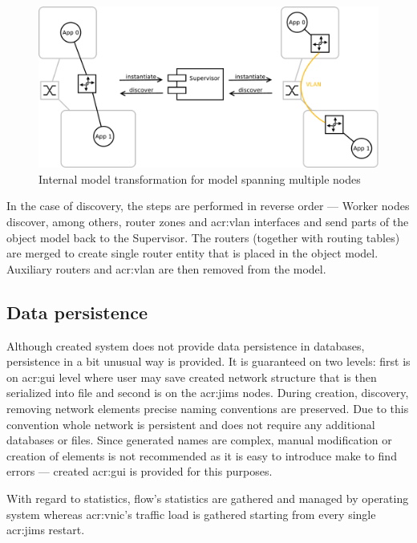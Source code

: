 \documentclass[11pt,openany]{book}
\begin{document}
          \begin{figure}[h]
            \centering
            \includegraphics[width=.9\textwidth]{img/test-case/router.pdf}

            \caption{Internal model transformation for model spanning multiple nodes}
            \label{fig:impl:router}
          \end{figure}

          In the case of discovery, the steps are performed in reverse order --- Worker nodes discover, among others,
          router zones and \gls{acr:vlan} interfaces and send parts of the object model back to the Supervisor. The
          routers (together with routing tables) are merged to create single router entity that is placed in the object
          model. Auxiliary routers and \gls{acr:vlan} are then removed from the model.
			
		
      \subsection{Data persistence}
      \label{sec:impl:persist}

        Although created system does not provide data persistence in databases, persistence in a bit unusual way  is
        provided. It is guaranteed on two levels: first is on \gls{acr:gui} level where user may save created network
        structure that is then serialized into file and second is on the \gls{acr:jims} nodes. During creation,
        discovery, removing network elements precise naming conventions are preserved. Due to this convention whole
        network is persistent and does not require any additional databases or files. Since generated names are complex,
        manual modification or creation of elements is not recommended as it is easy to introduce make to find errors
        --- created \gls{acr:gui} is provided for this purposes.

        With regard to statistics, flow's statistics are gathered and managed by operating system whereas
        \gls{acr:vnic}'s traffic load is gathered starting from every single \gls{acr:jims} restart.
\end{document}
